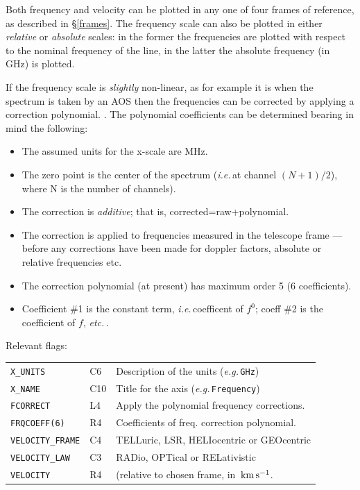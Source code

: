 \documentclass[11pt,twoside]{report}
\newcommand{\eg}{{\it e.g.\,}}
\newcommand{\etc}{{\it etc.\,}}
\newcommand{\ghz}{{\rm\,GHz}}
\newcommand{\ie}{{\it i.e.\,}}
\newcommand{\kms}{{\rm\,km\,s^{-1}}}
\begin{document}
Both frequency and velocity can be plotted in any one of four frames of
reference, as described in \S\ref{frames}.
The frequency scale can also be plotted in either {\em relative} or
{\em absolute} scales: in the former the frequencies are plotted with
respect to the nominal frequency of the line, in the latter the absolute
frequency (in \ghz) is plotted.

If the frequency scale is {\em slightly} non-linear, as for example it is
when the spectrum is taken by an AOS
then the frequencies can be corrected by applying a correction polynomial.
. The polynomial coefficients can be
determined bearing in mind the following:
\begin{itemize}
\item The assumed units for the x-scale are MHz.
\item The zero point is the center of the spectrum (\ie at channel $(N+1)/2$),
      where N is the number of channels).
\item The correction is {\em additive}; that is, corrected=raw+polynomial.
\item The correction is applied to frequencies measured in the telescope
      frame --- before any corrections have been made for doppler factors,
      absolute or relative frequencies etc.
\item The correction polynomial (at present) has maximum order 5
      (6 coefficients).
\item Coefficient \#1 is the constant term, \ie coefficent of $f^0$; coeff
      \#2 is the coefficient of $f$, \etc.
\end{itemize}

Relevant flags:\\
\begin{tabular}{lll}
   \verb+X_UNITS+ & C6 & Description of the units (\eg \verb+GHz+)\\
   \verb+X_NAME+  & C10& Title for the axis (\eg \verb+Frequency+)\\
   \verb+FCORRECT+ & L4& Apply the polynomial frequency corrections.\\
   \verb+FRQCOEFF(6)+ &R4& Coefficients of freq. correction polynomial.\\
   \verb+VELOCITY_FRAME+ & C4 & TELLuric, LSR, HELIocentric or GEOcentric\\
   \verb+VELOCITY_LAW+ & C3 & RADio, OPTical or RELativistic\\
   \verb+VELOCITY+ & R4 & (relative to chosen frame, in $\kms$.
\end{tabular}
\end{document}
